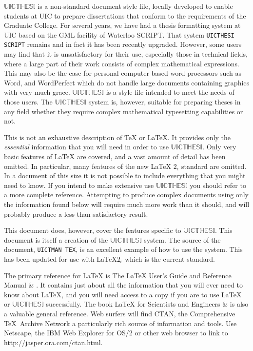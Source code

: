 \documentclass{uicthesi}
\newcommand{\uicthesi}{{$\mathbb{UICTHESI}$}}
\begin{document}
\uicthesi{} is a non-standard document style file, locally developed to
enable students at UIC to prepare dissertations that conform to the
requirements of the Graduate College.
For several years, we have had a thesis formatting system at UIC
based on the GML facility of Waterloo SCRIPT.
That system {\tt UICTHESI SCRIPT}
remains and in fact it has been recently upgraded.
However, some users may find that it is unsatisfactory for their
use, especially those in technical fields, where a large part of
their work consists of complex mathematical expressions. This may also be
the case for personal computer based word processors such as Word, and
WordPerfect which do not handle large documents containing graphics with
very much grace.
\uicthesi{} is a style file intended to meet the needs of those users.
The \uicthesi{} system is, however, suitable for preparing theses
in any field whether they require complex mathematical
typesetting capabilities or not.
 
This is not an exhaustive description of \TeX{} or \LaTeX{}.
It provides only the {\em essential} information that you
will need in order to use \uicthesi{}.
Only very basic features of \LaTeX{} are covered, and a
vast amount of detail has been omitted. In particular, many features of the new \LaTeX{} $2_\epsilon$ standard are omitted. In a document of this size
it is not possible to include everything that you might need to know.
If you intend to make extensive use \uicthesi{} you should
refer to a more complete reference.  Attempting to produce complex
documents using only the information found below will require
much more work than it should, and will probably produce a less
than satisfactory result.
 
This document does, however, cover the features specific to \uicthesi{}.
This document is itself a creation of the \uicthesi{} system.
The source of the document, \verb+UICTMAN TEX+, is an excellent
example of how to use the system. This has been updated for use with
\LaTeX{}$2_\epsilon$ which is the current standard.
 
The primary reference for \LaTeX{} is {\underl The \LaTeX{} User's Guide
and Reference Manual & }\cite{latex_guide}.
It contains just about all the information that you will ever
need to know about \LaTeX, and you will need access to a copy if
you are to use \LaTeX{} or \uicthesi{} successfully.
The book {\underl \LaTeX{} for Scientists and
Engineers & }\cite{latex_engineers}
is also a valuable general reference.
Web surfers will find CTAN, the Comprehensive \TeX\ Archive Network a
particularly rich source of information and tools. Use Netscape, the IBM
Web Explorer for OS/2 or other web browser to link to 
http://jasper.ora.com/ctan.html.
 
\end{document}
